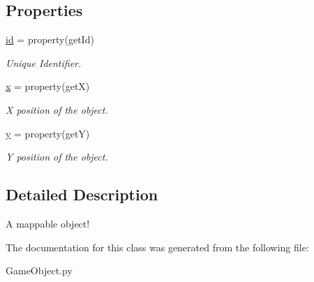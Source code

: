 \subsection*{\-Properties}
\begin{DoxyCompactItemize}
\item 
\hypertarget{classGameObject_1_1Mappable_a8fb47ecc6b9c9ab918d4de6e250c8d95}{\hyperlink{classGameObject_1_1Mappable_a8fb47ecc6b9c9ab918d4de6e250c8d95}{id} = property(get\-Id)}\label{classGameObject_1_1Mappable_a8fb47ecc6b9c9ab918d4de6e250c8d95}

\begin{DoxyCompactList}\small\item\em \-Unique \-Identifier. \end{DoxyCompactList}\item 
\hypertarget{classGameObject_1_1Mappable_a82b9fcc3376c4424a3559e59f961fd2b}{\hyperlink{classGameObject_1_1Mappable_a82b9fcc3376c4424a3559e59f961fd2b}{x} = property(get\-X)}\label{classGameObject_1_1Mappable_a82b9fcc3376c4424a3559e59f961fd2b}

\begin{DoxyCompactList}\small\item\em \-X position of the object. \end{DoxyCompactList}\item 
\hypertarget{classGameObject_1_1Mappable_af0dd1adab5455ec0aa786d9d2ce1365d}{\hyperlink{classGameObject_1_1Mappable_af0dd1adab5455ec0aa786d9d2ce1365d}{y} = property(get\-Y)}\label{classGameObject_1_1Mappable_af0dd1adab5455ec0aa786d9d2ce1365d}

\begin{DoxyCompactList}\small\item\em \-Y position of the object. \end{DoxyCompactList}\end{DoxyCompactItemize}


\subsection{\-Detailed \-Description}
\-A mappable object! 

\-The documentation for this class was generated from the following file\-:\begin{DoxyCompactItemize}
\item 
\-Game\-Object.\-py\end{DoxyCompactItemize}
